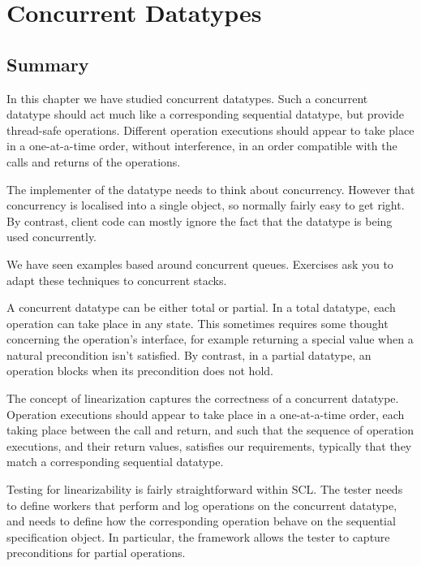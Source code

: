 \chapter{Concurrent Datatypes}
\label{chap:datatypes}



\section{Summary}

In this chapter we have studied concurrent datatypes.  Such a concurrent
datatype should act much like a corresponding sequential datatype, but provide
thread-safe operations.  Different operation executions should appear to take
place in a one-at-a-time order, without interference, in an order compatible
with the calls and returns of the operations.

The implementer of the datatype needs to think about concurrency.  However
that concurrency is localised into a single object, so normally fairly easy to
get right.  By contrast, client code can mostly ignore the fact that the
datatype is being used concurrently.

We have seen examples based around concurrent queues.  Exercises ask you to
adapt these techniques to concurrent stacks.

A concurrent datatype can be either total or partial.  In a total datatype,
each operation can take place in any state.  This sometimes requires some
thought concerning the operation's interface, for example returning a special
value when a natural precondition isn't satisfied.  By contrast, in a partial
datatype, an operation blocks when its precondition does not hold.

The concept of linearization captures the correctness of a concurrent
datatype.  Operation executions should appear to take place in a one-at-a-time
order, each taking place between the call and return, and such that the
sequence of operation executions, and their return values, satisfies our
requirements, typically that they match a corresponding sequential datatype.

Testing for linearizability is fairly straightforward within SCL.  The tester
needs to define workers that perform and log operations on the concurrent
datatype, and needs to define how the corresponding operation behave on the
sequential specification object.  In particular, the framework allows the
tester to capture preconditions for partial operations. 

